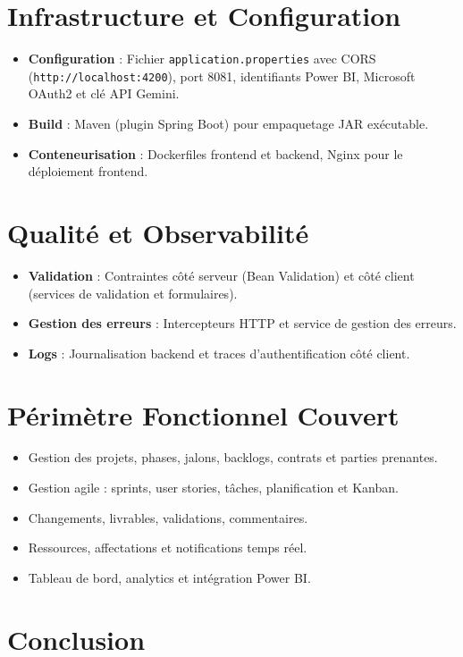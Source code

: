 \section{Infrastructure et Configuration}
\begin{itemize}
  \item \textbf{Configuration} : Fichier \texttt{application.properties} avec CORS (\texttt{http://localhost:4200}), port 8081, identifiants Power BI, Microsoft OAuth2 et clé API Gemini.
  \item \textbf{Build} : Maven (plugin Spring Boot) pour empaquetage JAR exécutable.
  \item \textbf{Conteneurisation} : Dockerfiles frontend et backend, Nginx pour le déploiement frontend.
\end{itemize}

\section{Qualité et Observabilité}
\begin{itemize}
  \item \textbf{Validation} : Contraintes côté serveur (Bean Validation) et côté client (services de validation et formulaires).
  \item \textbf{Gestion des erreurs} : Intercepteurs HTTP et service de gestion des erreurs.
  \item \textbf{Logs} : Journalisation backend et traces d’authentification côté client.
\end{itemize}

\section{Périmètre Fonctionnel Couvert}
\begin{itemize}
  \item Gestion des projets, phases, jalons, backlogs, contrats et parties prenantes.
  \item Gestion agile : sprints, user stories, tâches, planification et Kanban.
  \item Changements, livrables, validations, commentaires.
  \item Ressources, affectations et notifications temps réel.
  \item Tableau de bord, analytics et intégration Power BI.
\end{itemize}

\section{Conclusion}

